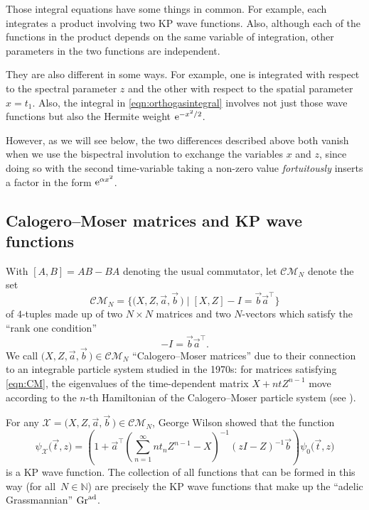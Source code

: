\documentclass[pdftex]{sigma}
\numberwithin{equation}{section}
\theoremstyle{definition}
\def\vt{\vec{t}}
\def\X{\mathcal{X}}
\def\CM{\mathcal{C\!M}}
\def\N{\mathbb{N}}
\begin{document}
Those integral equations have some things in common. For example, each integrates
a product involving two KP wave functions. Also, although each of the functions in
the product depends on the same variable of integration, other
parameters in the two functions are independent.

They are
also different in some ways. For example, one is integrated with respect to the
spectral parameter $z$ and the other with respect to the spatial
parameter $x=t_1$. Also, the integral in \eqref{eqn:orthogasintegral}
involves not just those wave functions but also the Hermite weight ${\rm e}^{-x^2/2}$.

However, as we will see below, the two differences described above
both vanish when we use the bispectral involution \cite{WilsonBisp} to
exchange the variables $x$ and $z$, since doing so with the second
time-variable taking a non-zero value \textit{fortuitously}
inserts a factor in the form ${\rm e}^{\alpha x^2}$.

\subsection{Calogero--Moser matrices and KP wave functions}

With $[A,B]=AB-BA$ denoting the usual commutator,
let $\CM_N$ denote the set
\[
\CM_N=\big\{\bigl(X,Z,\vec a,\vec b\,\bigr)\mid [X,Z]-I=\vec b\vec a^{\top}\big\}
\]
of $4$-tuples made up of two $N\times N$ matrices and two $N$-vectors which satisfy
the ``rank one condition''
\begin{equation}
 [X,Z]-I=\vec b\vec a^{\top}.\label{eqn:CM}
\end{equation}
 We call $\bigl(X,Z,\vec a,\vec b\,\bigr)\in \CM_N$ ``Calogero--Moser matrices''
 due to their connection to an integrable particle
system studied in the 1970s: for matrices satisfying \eqref{eqn:CM},
the eigenvalues of the time-dependent matrix $X+ntZ^{n-1}$ move according
to the $n$-th Hamiltonian of the Calogero--Moser particle system (see \cite{KKZ,WilsonCM}).


For any $\X=\bigl(X,Z,\vec a,\vec b\,\bigr)\in \CM_N$,
George Wilson \cite{WilsonCM} showed that the function
\begin{equation}
\psi_{\X}\bigl(\vt,z\bigr)=\left(1+\vec a^{\top}\left(\sum_{n=1}^{\infty}
 nt_nZ^{n-1}-X\right)^{-1}(zI-Z)^{-1}\vec b\right)\psi_0\bigl(\vt,z\bigr)
 \label{eqn:psiXZ}
 \end{equation}
is a KP wave function.
The collection of all functions that can be formed in this way (for all~$N\in \N$) are precisely the KP wave
 functions that make up the ``adelic Grassmannian'' ${\rm Gr}^{\rm ad}$.
\end{document}
